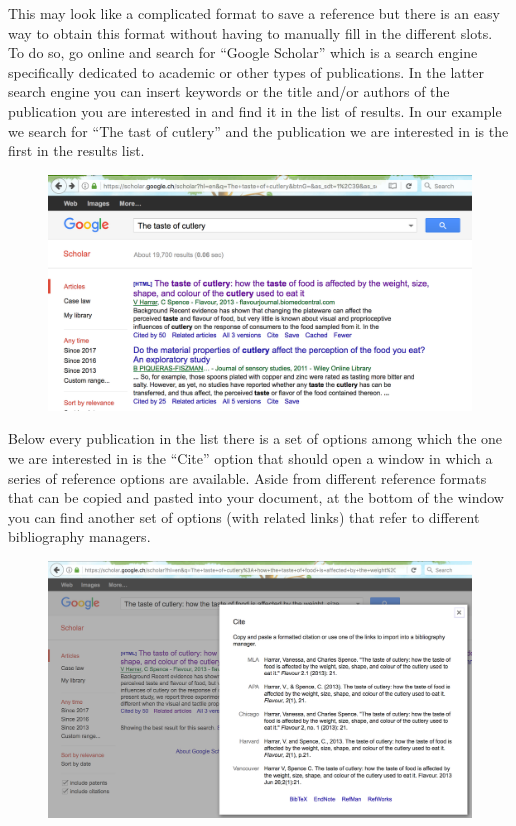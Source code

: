 \documentclass[]{book}
\theoremstyle{definition}
\theoremstyle{definition}
\theoremstyle{remark}
\begin{document}
This may look like a complicated format to save a reference but there is
an easy way to obtain this format without having to manually fill in the
different slots. To do so, go online and search for ``Google Scholar''
which is a search engine specifically dedicated to academic or other
types of publications. In the latter search engine you can insert
keywords or the title and/or authors of the publication you are
interested in and find it in the list of results. In our example we
search for ``The tast of cutlery'' and the publication we are interested
in is the first in the results list.

\begin{figure}[htbp]
\centering
\includegraphics{images/googlescholar1.png}
\caption{}
\end{figure}

Below every publication in the list there is a set of options among
which the one we are interested in is the ``Cite'' option that should
open a window in which a series of reference options are available.
Aside from different reference formats that can be copied and pasted
into your document, at the bottom of the window you can find another set
of options (with related links) that refer to different bibliography
managers.

\begin{figure}[htbp]
\centering
\includegraphics{images/googlescholar2.png}
\caption{}
\end{figure}
\end{document}
